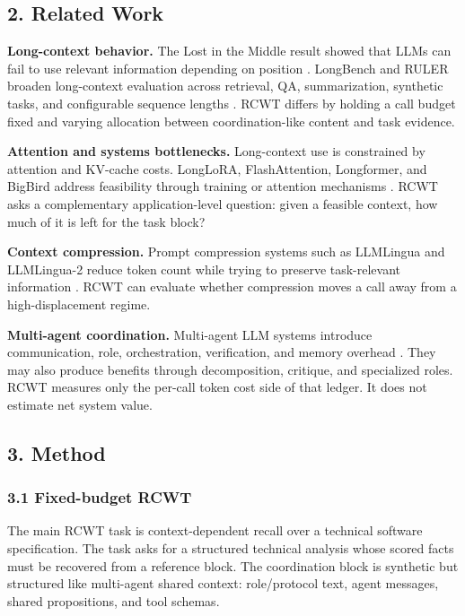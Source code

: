 \documentclass[
  runningheads]{llncs}
\begin{document}
\subsection{2. Related Work}\label{related-work}

\textbf{Long-context behavior.} The Lost in the Middle result showed
that LLMs can fail to use relevant information depending on position
\cite{lostmiddle}. LongBench and RULER broaden long-context evaluation
across retrieval, QA, summarization, synthetic tasks, and configurable
sequence lengths \cite{longbench,ruler}. RCWT differs by holding a call
budget fixed and varying allocation between coordination-like content
and task evidence.

\textbf{Attention and systems bottlenecks.} Long-context use is
constrained by attention and KV-cache costs. LongLoRA, FlashAttention,
Longformer, and BigBird address feasibility through training or
attention mechanisms \cite{longlora,flashattention,longformer,bigbird}.
RCWT asks a complementary application-level question: given a feasible
context, how much of it is left for the task block?

\textbf{Context compression.} Prompt compression systems such as
LLMLingua and LLMLingua-2 reduce token count while trying to preserve
task-relevant information \cite{jiang-etal-2023-llmlingua,llmlingua2}.
RCWT can evaluate whether compression moves a call away from a
high-displacement regime.

\textbf{Multi-agent coordination.} Multi-agent LLM systems introduce
communication, role, orchestration, verification, and memory overhead
\cite{mast,scalingagents}. They may also produce benefits through
decomposition, critique, and specialized roles. RCWT measures only the
per-call token cost side of that ledger. It does not estimate net system
value.

\subsection{3. Method}\label{method}

\subsubsection{3.1 Fixed-budget RCWT}\label{fixed-budget-rcwt}

The main RCWT task is context-dependent recall over a technical software
specification. The task asks for a structured technical analysis whose
scored facts must be recovered from a reference block. The coordination
block is synthetic but structured like multi-agent shared context:
role/protocol text, agent messages, shared propositions, and tool
schemas.
\end{document}
